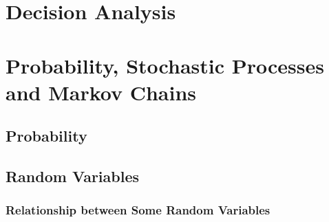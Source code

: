\documentclass[10pt]{book}
\begin{document}
	\part{Decision Analysis}
	

	\part{Probability, Stochastic Processes and Markov Chains}
		\chapter{Probability}

		\chapter{Random Variables}
			\section{Relationship between Some Random Variables}
\end{document}
